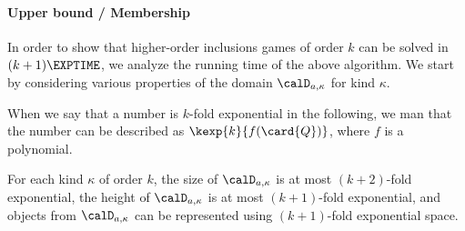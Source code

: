\documentclass[../../diss.tex]{subfiles}
\begin{document}
\paragraph{Upper bound / Membership}

In order to show that higher-order inclusions games of order $k$ can be solved in $(k+1)\EXPTIME$, we analyze the running time of the above algorithm.
We start by considering various properties of the domain $\domaina{\kappa}$ for kind $\kappa$.

When we say that a number is $k$-fold exponential in the following, we man that the number can be described as $\kexp{k}{f(\card{Q})}$, where $f$ is a polynomial.

\begin{lemma}%
\label{Lemma:HorseSolvingSizeAnalysis}%
    For each kind $\kappa$ of order $k$, the size of $\domaina{\kappa}$ is at most $(k+2)$-fold exponential, the height of $\domaina{\kappa}$ is at most $(k+1)$-fold exponential, and objects from $\domaina{\kappa}$ can be represented using $(k+1)$-fold exponential space.
\end{lemma}
\end{document}
